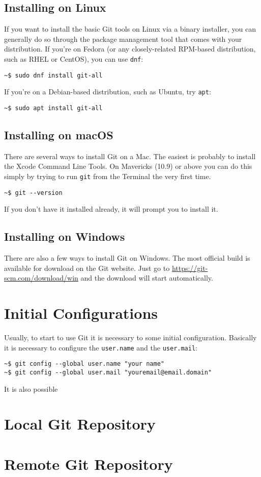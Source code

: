 \documentclass{article}
\begin{document}
\subsection{Installing on Linux}

If you want to install the basic Git tools on Linux via a binary installer, you can generally do so through the package management tool that comes with your distribution. If you’re on Fedora (or any closely-related RPM-based distribution, such as RHEL or CentOS), you can use \texttt{dnf}:

\begin{lstlisting}
~$ sudo dnf install git-all
\end{lstlisting}


If you’re on a Debian-based distribution, such as Ubuntu, try \texttt{apt}:

\begin{lstlisting}
~$ sudo apt install git-all
\end{lstlisting}

\subsection{Installing on macOS}

There are several ways to install Git on a Mac. The easiest is probably to install the Xcode Command Line Tools. On Mavericks (10.9) or above you can do this simply by trying to run \texttt{git} from the Terminal the very first time.

\begin{lstlisting}
~$ git --version
\end{lstlisting}
If you don’t have it installed already, it will prompt you to install it.

\subsection{Installing on Windows}

There are also a few ways to install Git on Windows. The most official build is available for download on the Git website. Just go to \url{https://git-scm.com/download/win} and the download will start automatically. 

\section{Initial Configurations}

Usually, to start to use Git it is necessary to some initial configuration. Basically it is necessary to configure the \texttt{user.name} and the \texttt{user.mail}:

\begin{lstlisting}
~$ git config --global user.name "your name"
~$ git config --global user.mail "youremail@email.domain"
\end{lstlisting}

It is also possible 

\section{Local Git Repository}

\section{Remote Git Repository}
\end{document}
